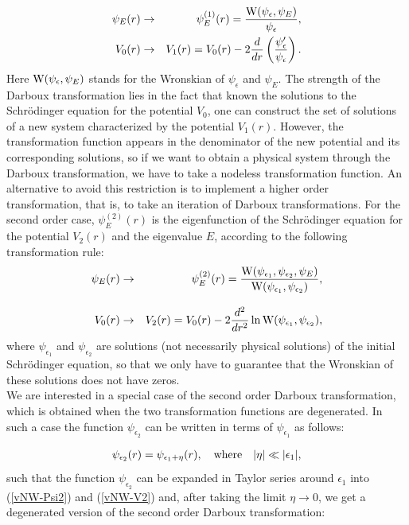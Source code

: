 \documentclass[a4paper]{jpconf}
\begin{document}
\begin{eqnarray*}
\psi_E(r) &\rightarrow& \psi_E^{(1)}(r)=\frac{{\rm W}(\psi_\epsilon,\psi_E)}{\psi_\epsilon},\\
V_0(r)&\rightarrow& V_1(r)=V_0(r)-2\frac{d}{dr}\left(\frac{\psi_\epsilon'}{\psi_\epsilon}\right).
\end{eqnarray*}
Here ${\rm W}(\psi_\epsilon,\psi_E)$ stands for the Wronskian of $\psi_\epsilon$ and $\psi_E$. The strength of the Darboux transformation lies in the fact that known  the solutions to the Schr\" odinger equation for the potential $V_0$, one can construct the set of solutions of a new system characterized by the potential $V_1(r)$. However, the transformation function appears in the denominator of the new potential and its corresponding solutions, so if we want to obtain a physical system through the Darboux transformation, we have to take a nodeless transformation function. An alternative to avoid this restriction is to implement a higher order transformation, that is, to take an iteration of Darboux transformations. For the second order case, $\psi_E^{(2)}(r)$ is the eigenfunction of the Schr\" odinger equation for the potential $V_2(r)$ and the eigenvalue $E$, according to the following transformation rule:
\begin{eqnarray}
\psi_E(r) &\rightarrow& \psi_E^{(2)}(r)=\frac{{\rm W}(\psi_{\epsilon_1},\psi_{\epsilon_2},\psi_E)}{{\rm W}(\psi_{\epsilon_1},\psi_{\epsilon_2})},\label{vNW-Psi2}\\[0.3cm]
V_0(r)&\rightarrow& V_2(r)=V_0(r)-2\frac{d^2}{dr^2}\ln{{\rm W}(\psi_{\epsilon_1},\psi_{\epsilon_2})},\label{vNW-V2}
\end{eqnarray}
where $\psi_{\epsilon_1}$ and $\psi_{\epsilon_2}$ are solutions (not necessarily physical solutions) of the initial Schr\" odinger equation, so that we only have to guarantee that the Wronskian of these solutions does not have zeros.\\
We are interested in a special case of the second order Darboux transformation, which is obtained when the two transformation functions are degenerated.  In such a case the function $\psi_{\epsilon_2}$ can be written in terms of $\psi_{\epsilon_1}$ as follows:

\begin{eqnarray*}
\psi_{\epsilon_2}(r)=\psi_{\epsilon_1+\eta}(r),\quad{\rm where}\quad |\eta|\ll |\epsilon_1|,
\end{eqnarray*}
such that the function $\psi_{\epsilon_2}$ can be expanded in Taylor series around $\epsilon_{1}$ into (\ref{vNW-Psi2}) and (\ref{vNW-V2}) and, after taking the limit $\eta\rightarrow0$, we get a degenerated version of the second order Darboux transformation:
\end{document}
